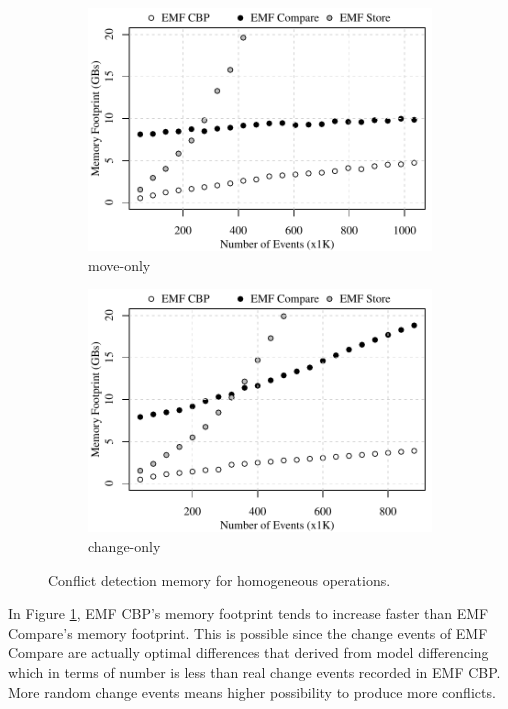 \begin{figure}[ht]
\begin{subfigure}[t]{0.490\linewidth}
    \includegraphics[width=\linewidth]{move-conflict-memory-events}
    \caption{move-only}
    \label{fig:move-conflict-memory-events}
  \end{subfigure}
  \hfill
  \begin{subfigure}[t]{0.490\linewidth}
    \includegraphics[width=\linewidth]{change-conflict-memory-events}
    \caption{change-only}
    \label{fig:change-conflict-memory-events}
  \end{subfigure}
  \caption{Conflict detection memory for homogeneous operations.}
  \label{fig:homgeneous_operation_memory_events}
\end{figure}

In Figure \ref{fig:move-conflict-memory-events}, EMF CBP's memory footprint tends to increase faster than EMF Compare's memory footprint. This is possible since the change events of EMF Compare are actually optimal differences that derived from model differencing which in terms of number is less than real change events recorded in EMF CBP. More random change events means higher possibility to produce more conflicts.

